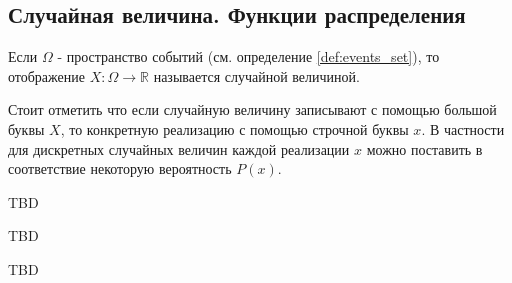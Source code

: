 \subsection{Случайная величина. Функции распределения}

\begin{definition}
\label{def:random_variable}
Если $\Omega$ - пространство событий (см. определение \autoref{def:events_set}), то 
отображение $X: \Omega \to \mathbb{R}$ называется случайной
величиной. 
\end{definition}

Стоит отметить что если случайную величину записывают с помощью
большой буквы $X$, то конкретную реализацию с помощью строчной буквы
$x$. В частности для дискретных случайных величин каждой реализации
$x$ можно поставить в соответствие некоторую вероятность
$P\left(x\right)$. 

\begin{definition}
TBD
\end{definition}

\begin{definition}
TBD
\end{definition}

TBD
